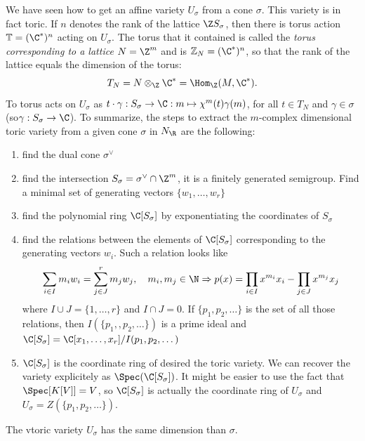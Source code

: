 \documentclass{worksheetclass}
\begin{document}
        We have seen how to get an affine variety $U_\sigma$ from a cone $\sigma$. This variety is in fact toric. If $n$ denotes the rank of the lattice $\Z S_\sigma$, then there is torus action $\mathbb{T}=(\C^*)^n$ acting on $U_\sigma$. The torus that it contained is called the \emph{torus corresponding to a lattice} $N=\Z^m$ and is $\mathbb{Z}_N=(\C^*)^n$, so that the rank of the lattice equals the dimension of the torus:
        \begin{equation}
            T_N = N\otimes_\Z\C^*=\Hom_\Z(M,\C^*).
        \end{equation}
        To torus acts on $U_\sigma$ as $t\cdot\gamma:S_\sigma\to\C:m\mapsto\chi^m(t)\gamma(m)$, for all $t\in T_N$ and $\gamma\in\sigma$ (so$\gamma:S_\sigma\to\C$). To summarize, the steps to extract the $m$-complex dimensional toric variety from a given cone $\sigma$ in $N_\R$ are the following:
        \begin{enumerate}
            \item find the dual cone $\sigma^\vee$
            \item find the intersection $S_\sigma = \sigma^\vee\cap\Z^m$, it is a finitely generated semigroup. Find a minimal set of generating vectors $\{w_1,\dots,w_r\}$
            \item find the polynomial ring $\C[S_\sigma]$ by exponentiating the coordinates of $S_\sigma$
            \item find the relations between the elements of $\C[S_\sigma]$ corresponding to the generating vectors $w_i$. Such a relation looks like
            \begin{equation}
                \sum_{i\in I} m_iw_i=\sum^r_{j\in J}m_jw_j,\quad m_i,m_j\in\N\Rightarrow p(x)=\prod_{i\in I}x^{m_i}x_i-\prod_{j\in J}x^{m_j}x_j
            \end{equation}
            where $I\cup J=\{1,\dots,r\}$ and $I\cap J=0$. If $\{p_1,p_2,\dots\}$ is the set of all those relations, then $I(\{p_1,,p_2,\dots\})$ is a prime ideal and $\C[S_\sigma]=\C[x_1,\dots,x_r]/I(p_1,p_2,\dots)$
            \item $\C[S_\sigma]$ is the coordinate ring of desired the toric variety. We can recover the variety explicitely as $\Spec(\C[S_\sigma])$. It might be easier to use the fact that $\Spec[K[V]]=V$, so $\C[S_\sigma]$ is actually the coordinate ring of $U_\sigma$ and $U_\sigma=Z(\{p_1,p_2,\dots\})$.
        \end{enumerate}
        The vtoric variety $U_\sigma$ has the same dimension than $\sigma$.
\end{document}
